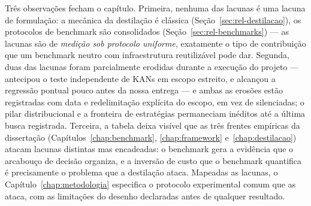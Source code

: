 Três observações fecham o capítulo. Primeira, nenhuma das lacunas é uma
lacuna de formulação: a mecânica da destilação é clássica
(Seção~\ref{sec:rel-destilacao}), os protocolos de benchmark são
consolidados (Seção~\ref{sec:rel-benchmarks}) --- as lacunas são de
\emph{medição sob protocolo uniforme}, exatamente o tipo de contribuição
que um benchmark neutro com infraestrutura reutilizável pode dar. Segunda,
duas das lacunas foram parcialmente erodidas durante a execução do projeto
--- \citet{poeta2024} antecipou o teste independente de KANs em escopo
estreito, e \citet{jeong2026} alcançou a regressão pontual pouco antes da
nossa entrega --- e ambas as erosões estão registradas com data e
redelimitação explícita do escopo, em vez de silenciadas; o pilar distribucional e a
fronteira de estratégias permaneciam inéditos até a última busca
registrada. Terceira, a
tabela deixa visível que as três frentes empíricas da dissertação
(Capítulos~\ref{chap:benchmark}, \ref{chap:framework}
e~\ref{chap:destilacao}) atacam lacunas distintas mas encadeadas: o
benchmark gera a evidência que o arcabouço de decisão organiza, e a
inversão de custo que o benchmark quantifica é precisamente o problema que
a destilação ataca. Mapeadas as lacunas, o Capítulo~\ref{chap:metodologia}
especifica o protocolo experimental comum que as ataca, com as limitações
do desenho declaradas antes de qualquer resultado.
